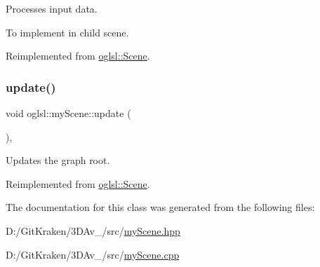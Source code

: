 Processes input data. 

To implement in child scene. 

Reimplemented from \mbox{\hyperlink{classoglsl_1_1_scene_a7884a3f2b7900aaf348a62ad23223c8e}{oglsl\+::\+Scene}}.

\mbox{\label{classoglsl_1_1my_scene_a798dcfe11aee5c093013c59b665b6754}} 
\subsubsection{\texorpdfstring{update()}{update()}}
{\footnotesize\ttfamily void oglsl\+::my\+Scene\+::update (\begin{DoxyParamCaption}{ }\end{DoxyParamCaption})\hspace{0.3cm}{\ttfamily [override]}, {\ttfamily [virtual]}}



Updates the graph root. 



Reimplemented from \mbox{\hyperlink{classoglsl_1_1_scene_accbf0c6f23ccd909f63851c0bc547449}{oglsl\+::\+Scene}}.



The documentation for this class was generated from the following files\+:\begin{DoxyCompactItemize}
\item 
D\+:/\+Git\+Kraken/3\+D\+Av\+\_/src/\mbox{\hyperlink{my_scene_8hpp}{my\+Scene.\+hpp}}\item 
D\+:/\+Git\+Kraken/3\+D\+Av\+\_/src/\mbox{\hyperlink{my_scene_8cpp}{my\+Scene.\+cpp}}\end{DoxyCompactItemize}

